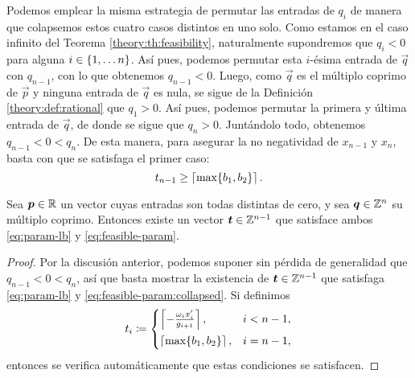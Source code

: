 Podemos emplear la misma estrategia de permutar las entradas de $q_i$ de manera que colapsemos estos
cuatro casos distintos en uno solo. Como estamos en el caso infinito del Teorema
\ref{theory:th:feasibility}, naturalmente supondremos que $q_i < 0$ para alguna $i \in \lbrace 1,
\ldots n \rbrace$. Así pues, podemos permutar esta $i$-ésima entrada de $\vec{q}$ con $q_{n-1}$, con lo que
obtenemos $q_{n-1} < 0$. Luego, como $\vec{q}$ es el múltiplo coprimo de $\vec{p}$ y ninguna entrada
de $\vec{q}$ es nula, se sigue de la Definición \ref{theory:def:rational} que $q_1 > 0$. Así pues,
podemos permutar la primera y última entrada de $\vec{q}$, de donde se sigue que $q_n > 0$.
Juntándolo todo, obtenemos $q_{n-1} < 0 < q_n$. De esta manera, para asegurar la no negatividad de
$x_{n-1}$ y $x_n$, basta con que se satisfaga el primer caso:
\begin{equation}
	\label{eq:feasible-param:collapsed}
	t_{n-1} \geq \left\lceil \max\lbrace b_1, b_2 \rbrace \right\rceil.
\end{equation}

\begin{lemma}
	\label{lemma:t-existence}
	Sea $\boldsymbol{p} \in \mathbb{R}$ un vector cuyas entradas son todas distintas de cero, y sea $\boldsymbol{q} \in
	\mathbb{Z}^n$ su múltiplo coprimo. Entonces existe un vector $\boldsymbol{t} \in \mathbb{Z}^{n-1}$ que satisface ambos
	\eqref{eq:param-lb} y \eqref{eq:feasible-param}.
\end{lemma}
\begin{proof}
	Por la discusión anterior, podemos suponer sin pérdida de generalidad que $q_{n-1} < 0 < q_n$,
	así que basta mostrar la existencia de  $\boldsymbol{t} \in \mathbb{Z}^{n-1}$ que satisfaga \eqref{eq:param-lb} y
	\eqref{eq:feasible-param:collapsed}. Si definimos
	\begin{equation*}
		t_i \coloneq \begin{cases}
			\left\lceil -\frac{\omega_ix_i'}{g_{i + 1}} \right\rceil, & i < n - 1, \\[0.5em]
			\left\lceil \max\lbrace b_1, b_2 \rbrace \right\rceil, & i = n - 1,
		\end{cases}
	\end{equation*}
	entonces se verifica automáticamente que estas condiciones se satisfacen.
\end{proof}

